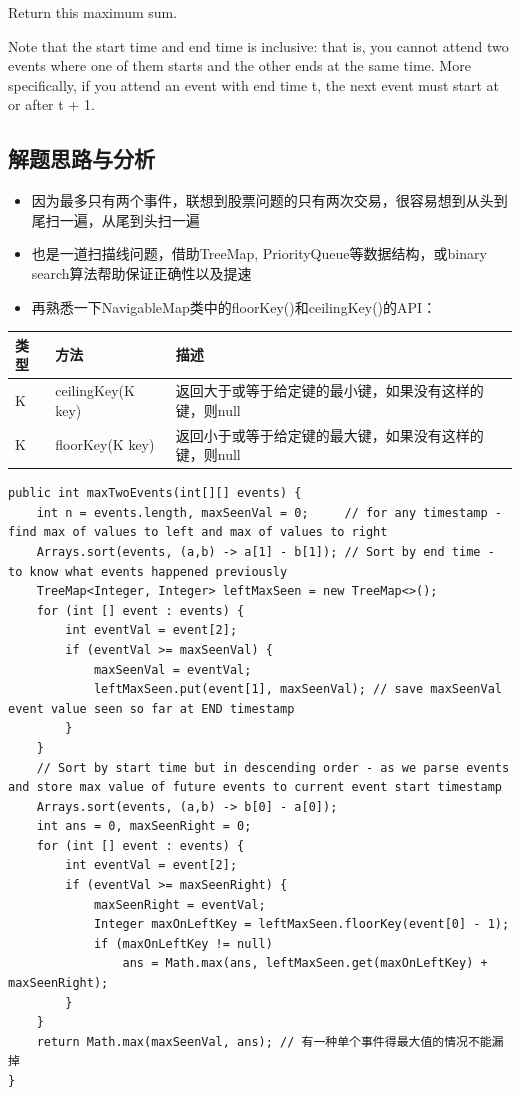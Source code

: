 \documentclass[9pt, b5paaper]{book}
\begin{document}
Return this maximum sum.

Note that the start time and end time is inclusive: that is, you cannot attend two events where one of them starts and the other ends at the same time. More specifically, if you attend an event with end time t, the next event must start at or after t + 1.
\subsection{解题思路与分析}
\label{sec-19-1-1}
\begin{itemize}
\item 因为最多只有两个事件，联想到股票问题的只有两次交易，很容易想到从头到尾扫一遍，从尾到头扫一遍
\item 也是一道扫描线问题，借助TreeMap, PriorityQueue等数据结构，或binary search算法帮助保证正确性以及提速
\item 再熟悉一下NavigableMap类中的floorKey()和ceilingKey()的API：
\end{itemize}
\begin{center}
\begin{tabular}{lll}
\hline
类型 & 方法 & 描述\\
\hline
K & ceilingKey(K key) & 返回大于或等于给定键的最小键，如果没有这样的键，则null\\
K & floorKey(K key) & 返回小于或等于给定键的最大键，如果没有这样的键，则null\\
\hline
\end{tabular}
\end{center}
\begin{verbatim}
public int maxTwoEvents(int[][] events) {  
    int n = events.length, maxSeenVal = 0;     // for any timestamp - find max of values to left and max of values to right
    Arrays.sort(events, (a,b) -> a[1] - b[1]); // Sort by end time - to know what events happened previously
    TreeMap<Integer, Integer> leftMaxSeen = new TreeMap<>();
    for (int [] event : events) {
        int eventVal = event[2];
        if (eventVal >= maxSeenVal) {
            maxSeenVal = eventVal;
            leftMaxSeen.put(event[1], maxSeenVal); // save maxSeenVal event value seen so far at END timestamp
        }
    }
    // Sort by start time but in descending order - as we parse events and store max value of future events to current event start timestamp
    Arrays.sort(events, (a,b) -> b[0] - a[0]);
    int ans = 0, maxSeenRight = 0;
    for (int [] event : events) {
        int eventVal = event[2];
        if (eventVal >= maxSeenRight) {
            maxSeenRight = eventVal;
            Integer maxOnLeftKey = leftMaxSeen.floorKey(event[0] - 1);
            if (maxOnLeftKey != null)
                ans = Math.max(ans, leftMaxSeen.get(maxOnLeftKey) + maxSeenRight);
        }
    }
    return Math.max(maxSeenVal, ans); // 有一种单个事件得最大值的情况不能漏掉
}
\end{verbatim}
\end{document}
